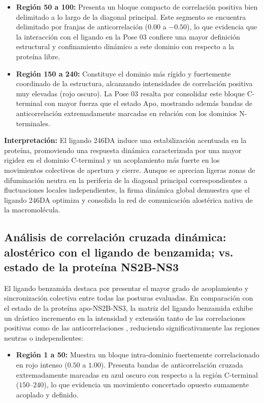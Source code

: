 \begin{table}[htbp]
\begin{itemize}
    \item \textbf{Región 50 a 100:} Presenta un bloque compacto de correlación positiva bien delimitado a lo largo de la diagonal principal. Este segmento se encuentra delimitado por franjas de anticorrelación ($0.00$ a $-0.50$), lo que evidencia que la interacción con el ligando en la Pose 03 confiere una mayor definición estructural y confinamiento dinámico a este dominio con respecto a la proteína libre.
    
    \item \textbf{Región 150 a 240:} Constituye el dominio más rígido y fuertemente coordinado de la estructura, alcanzando intensidades de correlación positiva muy elevadas (rojo oscuro). La Pose 03 resalta por consolidar este bloque C-terminal con mayor fuerza que el estado Apo, mostrando además bandas de anticorrelación extremadamente marcadas en relación con los dominios N-terminales.
\end{itemize}

\textbf{Interpretación:} El ligando 246DA induce una estabilización acentuada en la proteína, promoviendo una respuesta dinámica caracterizada por una mayor rigidez en el dominio C-terminal y un acoplamiento más fuerte en los movimientos colectivos de apertura y cierre. Aunque se aprecian ligeras zonas de difuminación neutra  en la periferia de la diagonal principal correspondientes a fluctuaciones locales independientes, la firma dinámica global demuestra que el ligando 246DA optimiza y consolida la red de comunicación alostérica nativa de la macromolécula.

\subsection*{Análisis de correlación cruzada dinámica: alostérico con el ligando de benzamida;  vs. estado de la proteína NS2B-NS3}

El ligando benzamida destaca por presentar el mayor grado de acoplamiento y sincronización colectiva entre todas las posturas evaluadas. En comparación con el estado de la proteína apo-NS2B-NS3, la matriz del ligando benzamida exhibe un drástico incremento en la intensidad y extensión tanto de las correlaciones positivas  como de las anticorrelaciones , reduciendo significativamente las regiones neutras o independientes:

\begin{itemize}
    \item \textbf{Región 1 a 50:} Muestra un bloque intra-dominio fuertemente correlacionado en rojo intenso ($0.50$ a $1.00$). Presenta bandas de anticorrelación cruzada extremadamente marcadas en azul oscuro  con respecto a la región C-terminal ($150$--$240$), lo que evidencia un movimiento concertado opuesto sumamente acoplado y definido.
    

\end{itemize}
\end{table}

